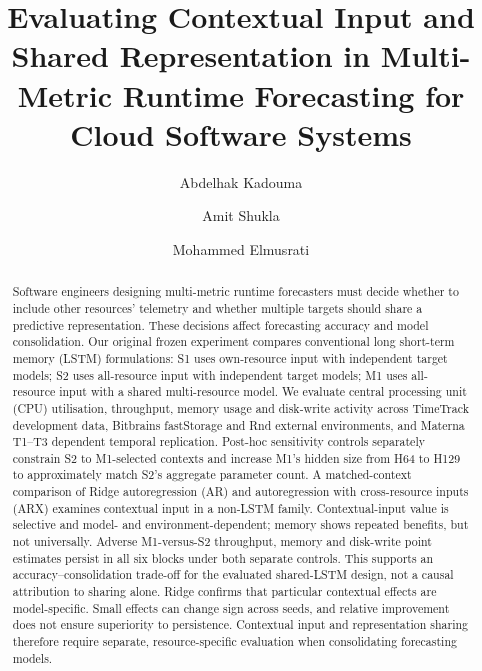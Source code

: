 \documentclass[a4paper,fleqn]{cas-dc}
\begin{document}

\title[mode=title]{Evaluating Contextual Input and Shared Representation in Multi-Metric Runtime Forecasting for Cloud Software Systems}

\author[1]{Abdelhak Kadouma}
\cormark[1]

\author[1]{Amit Shukla}

\author[1]{Mohammed Elmusrati}



\begin{abstract}
Software engineers designing multi-metric runtime forecasters must decide
whether to include other resources' telemetry and whether multiple targets
should share a predictive representation. These decisions affect forecasting
accuracy and model consolidation. Our original frozen experiment compares
conventional long short-term memory (LSTM) formulations: S1 uses own-resource
input with independent target models; S2 uses all-resource input with
independent target models; M1 uses all-resource input with a shared
multi-resource model. We evaluate central processing unit (CPU) utilisation, throughput, memory usage
and disk-write activity across TimeTrack development data, Bitbrains
fastStorage and Rnd external environments, and Materna T1--T3 dependent
temporal replication. Post-hoc sensitivity controls separately constrain S2
to M1-selected contexts and increase M1's hidden size from H64 to H129 to
approximately match S2's aggregate parameter count. A matched-context
comparison of Ridge autoregression (AR) and autoregression with cross-resource
inputs (ARX) examines contextual input in a non-LSTM family.
Contextual-input value is selective and model- and environment-dependent;
memory shows repeated benefits, but not universally. Adverse M1-versus-S2
throughput, memory and disk-write point estimates persist in all six blocks
under both separate controls. This supports an accuracy--consolidation
trade-off for the evaluated shared-LSTM design, not a causal attribution to
sharing alone. Ridge confirms that particular contextual effects are
model-specific. Small effects can change sign across seeds, and relative
improvement does not ensure superiority to persistence. Contextual input and
representation sharing therefore require separate, resource-specific
evaluation when consolidating forecasting models.
\end{abstract}
\end{document}
